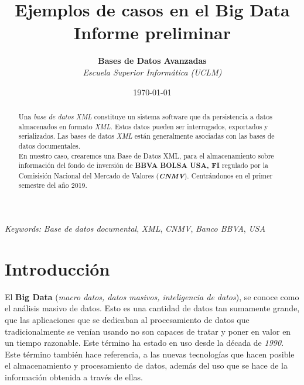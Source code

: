 \documentclass[11pt]{diazessay} %
\title{\textbf{Ejemplos de casos en el Big Data \\ Informe preliminar}} %
\author{\textbf{Bases de Datos Avanzadas} \\ \textit{Escuela Superior Informática (UCLM)}} %
\date{\today} %
\begin{document}
\maketitle %




\begin{abstract}
	
	Una \textit{base de datos XML} constituye un sistema software que da persistencia a datos almacenados en formato \textit{XML}. Estos datos pueden ser interrogados, exportados y serializados. Las bases de datos \textit{XML} están generalmente asociadas con las bases de datos documentales.\\
	
	En nuestro caso, crearemos una Base de Datos XML, para el almacenamiento sobre información del fondo de inversión de \textbf{BBVA BOLSA USA, FI} regulado por la Comisisión Nacional del Mercado de Valores (\textbf{\textit{CNMV}}). Centrándonos en el primer semestre del año 2019.
\end{abstract}

\hspace*{3.6mm}\textit{Keywords:} \textit{Base de datos documental}, \textit{XML}, \textit{CNMV}, \textit{Banco BBVA}, \textit{USA}

\vspace{20pt} %

\newpage
\section*{Introducción}

El \textbf{Big Data} (\textit{macro datos, datos masivos, inteligencia de datos}), se conoce como el análisis masivo de datos. Esto es una cantidad de datos tan sumamente grande, que las aplicaciones que se dedicaban al  procesamiento de datos que tradicionalmente se venían usando no son capaces de tratar y poner en valor en un tiempo razonable. Este  término ha estado en uso desde la década de \textit{1990}.\\
Este término también hace referencia, a las nuevas tecnologías que hacen posible el almacenamiento y procesamiento de datos, además del uso que se hace de la información obtenida a través de ellas.\\
\end{document}
